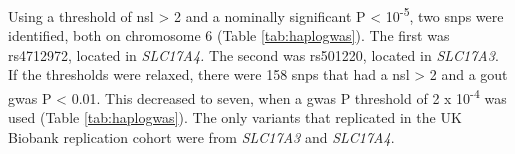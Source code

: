 \documentclass[]{report}
\begin{document}
Using a threshold of \textbar{}\gls{nsl}\textbar{} \textgreater{} 2 and
a nominally significant P \textless{} 10\textsuperscript{-5}, two
\glspl{snp} were identified, both on chromosome 6 (Table
\ref{tab:haplogwas}). The first was rs4712972, located in
\emph{SLC17A4.} The second was rs501220, located in \emph{SLC17A3}. If
the thresholds were relaxed, there were 158 \glspl{snp} that had a
\textbar{}\gls{nsl}\textbar{} \textgreater{} 2 and a gout \gls{gwas} P
\textless{} 0.01. This decreased to seven, when a \gls{gwas} P threshold
of 2 x 10\textsuperscript{-4} was used (Table \ref{tab:haplogwas}). The
only variants that replicated in the UK Biobank replication cohort were
from \emph{SLC17A3} and \emph{SLC17A4}.

\begin{landscape}\begin{table}


\end{table}
\end{landscape}
\end{document}
